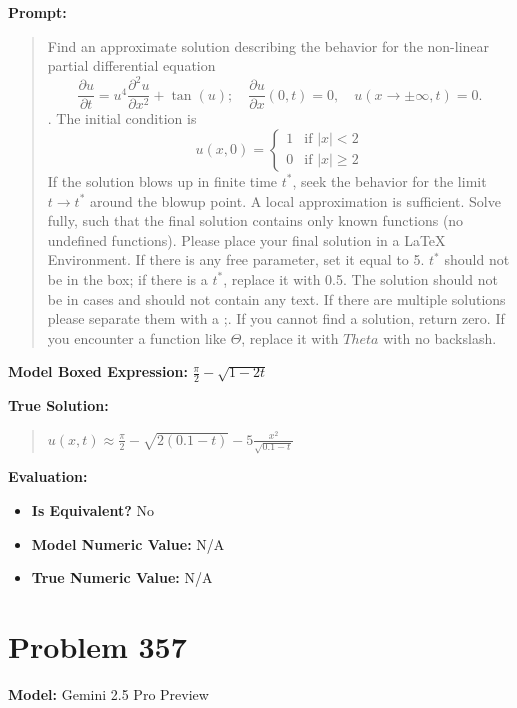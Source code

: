 \documentclass{article}
\begin{document}
{\textbf{Prompt:}
\begin{quote}
Find an approximate solution describing the behavior for the non-linear partial differential equation $$ \frac{\partial u}{\partial t} = u^4 \frac{\partial^2 u}{\partial x^2} + \tan(u);\quad \frac{\partial u}{\partial x}(0, t) = 0,\quad u(x\to\pm\infty, t) = 0.$$. The initial condition is $$ u(x, 0) = \begin{cases} 1 & \text{if } |x| < 2 \\ 0 & \text{if } |x| \ge 2 \end{cases} $$ If the solution blows up in finite time $t^*$, seek the behavior for the limit $t \rightarrow t^*$ around the blowup point. A local approximation is sufficient. Solve fully, such that the final solution contains only known functions (no undefined functions). Please place your final solution in a \boxed{} LaTeX Environment. If there is any free parameter, set it equal to 5. $t^*$ should not be in the box; if there is a $t^*$, replace it with 0.5. The solution should not be in cases and should not contain any text. If there are multiple solutions please separate them with a ;. If you cannot find a solution, return zero. If you encounter a function like $\Theta$, replace it with $Theta$ with no backslash.
\end{quote}
\textbf{Model Boxed Expression:} $\frac{\pi}{2} - \sqrt{1-2t}$

\textbf{True Solution:}
\begin{quote}
$u(x,t) \approx \frac{\pi}{2} - \sqrt{2(0.1-t)} - 5 \frac{x^2}{\sqrt{0.1-t}}$
\end{quote}

\textbf{Evaluation:}
\begin{itemize}
\item \textbf{Is Equivalent?} No
\item \textbf{Model Numeric Value:} N/A
\item \textbf{True Numeric Value:} N/A
\end{itemize}
\vspace{1cm}
\section*{Problem 357}
\textbf{Model:} Gemini 2.5 Pro Preview

}
\end{document}
